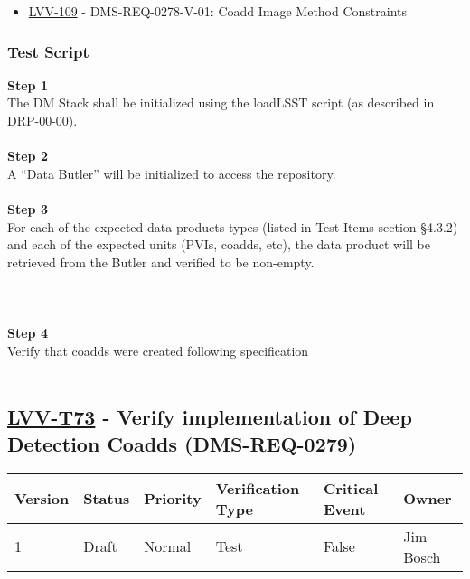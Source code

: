 \begin{itemize}
\tightlist
\item
  \href{https://jira.lsstcorp.org/browse/LVV-109}{LVV-109} -
  DMS-REQ-0278-V-01: Coadd Image Method Constraints
\end{itemize}

\hypertarget{test-script-162}{%
\subsubsection{Test Script}\label{test-script-162}}

\textbf{Step 1}\\
The DM Stack shall be initialized using the loadLSST script (as
described in DRP-00-00).\\
~\\
\textbf{Step 2}\\
A ``Data Butler'' will be initialized to access the repository.\\
~\\
\textbf{Step 3}\\
For each of the expected data products types (listed in Test Items
section §4.3.2) and each of the expected units (PVIs, coadds, etc), the
data product will be retrieved from the Butler and verified to be
non-empty.\\
~\\
~\\
~\\
\textbf{Step 4}\\
Verify that coadds were created following specification\\
~\\

\hypertarget{lvv-t73---verify-implementation-of-deep-detection-coadds-dms-req-0279}{%
\subsection{\texorpdfstring{\href{https://jira.lsstcorp.org/secure/Tests.jspa\#/testCase/LVV-T73}{LVV-T73}
- Verify implementation of Deep Detection Coadds
(DMS-REQ-0279)}{LVV-T73 - Verify implementation of Deep Detection Coadds (DMS-REQ-0279)}}\label{lvv-t73---verify-implementation-of-deep-detection-coadds-dms-req-0279}}

\begin{longtable}[]{@{}llllll@{}}
\toprule
Version & Status & Priority & Verification Type & Critical Event &
Owner\tabularnewline
\midrule
\endhead
1 & Draft & Normal & Test & False & Jim Bosch\tabularnewline
\bottomrule
\end{longtable}

